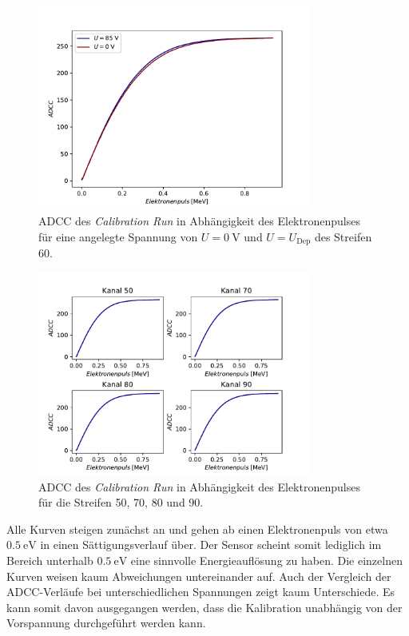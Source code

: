 \begin{figure}
  \centering
  \includegraphics[width=0.8\textwidth]{plots/0V_80V_Vergleich.pdf}
  \caption{ADCC des \textit{Calibration Run} in Abhängigkeit des Elektronenpulses für eine angelegte Spannung von $U=\SI{0}{\volt}$ und $U=U_\mathrm{Dep}$ des Streifen 60.}
  \label{fig:0V80V}
\end{figure}
\FloatBarrier
\begin{figure}
  \centering
  \includegraphics[width=0.8\textwidth]{plots/Kalib_Kanal_Plot.pdf}
  \caption{ADCC des \textit{Calibration Run} in Abhängigkeit des Elektronenpulses für die Streifen 50, 70, 80 und 90.}
  \label{fig:KanalPlot}
\end{figure}
\FloatBarrier
Alle Kurven steigen zunächst an und gehen ab einen Elektronenpuls von etwa $\SI{0.5}{\electronvolt}$ in einen Sättigungsverlauf über. Der Sensor scheint somit lediglich im Bereich unterhalb $\SI{0.5}{\electronvolt}$ eine sinnvolle Energieauflösung zu haben.
Die einzelnen Kurven weisen kaum Abweichungen untereinander auf. Auch der Vergleich der ADCC-Verläufe bei unterschiedlichen Spannungen zeigt kaum Unterschiede. Es kann somit davon ausgegangen werden, dass die Kalibration unabhängig von der Vorspannung durchgeführt werden kann.

